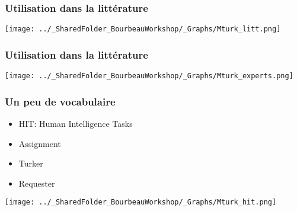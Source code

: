 \documentclass{beamer}
\begin{document}

    \begin{frame}
    
      \frametitle{Utilisation dans la littérature} \vspace{1cm}
      
       \begin{center}
         \texttt{[image: ../\_SharedFolder\_BourbeauWorkshop/\_Graphs/Mturk\_litt.png]}
        \end{center} 
   
         
    \end{frame}  
  
  

    \begin{frame}
    
      \frametitle{Utilisation dans la littérature} \vspace{1cm}
      
       \begin{center}
         \texttt{[image: ../\_SharedFolder\_BourbeauWorkshop/\_Graphs/Mturk\_experts.png]}
        \end{center} 
   
         
    \end{frame}  
    
    

    \begin{frame}
    
      \frametitle{Un peu de vocabulaire} \vspace{1cm}
      
       \begin{itemize}
          \item{HIT: Human Intelligence Tasks}
          \item{Assignment}
          \item{Turker}
          \item{Requester}
        \end{itemize}
   
   \begin{flushright}
     	    \texttt{[image: ../\_SharedFolder\_BourbeauWorkshop/\_Graphs/Mturk\_hit.png]}
    \end{flushright} 
         
    \end{frame}  
    
\end{document}

